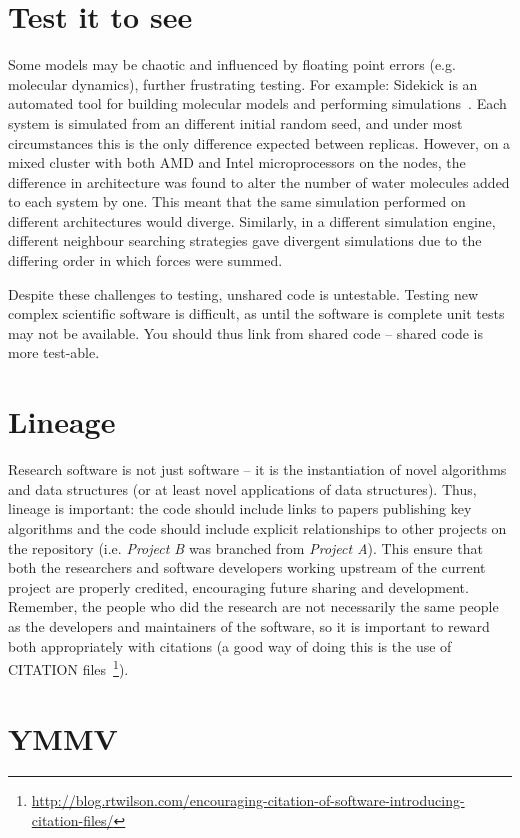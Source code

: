 \documentclass[conference]{IEEEtran}
\begin{document}
\section{Test it to see}

Some models may be chaotic and influenced by floating point errors
(e.g. molecular dynamics), further frustrating testing. For example:
Sidekick is an automated tool for building molecular models and
performing simulations~\cite{Hall2014Sidekick}. Each system is
simulated from an different initial random seed, and under most
circumstances this is the only difference expected between
replicas. However, on a mixed cluster with both AMD and Intel
microprocessors on the nodes, the difference in architecture was found
to alter the number of water molecules added to each system by
one. This meant that the same simulation performed on different
architectures would diverge. Similarly, in a different simulation
engine, different neighbour searching strategies gave divergent
simulations due to the differing order in which forces were summed.

Despite these challenges to testing, unshared code is untestable.
Testing new complex scientific software is
difficult, as until the software is complete unit tests may not be
available. You should thus link from shared code -- shared code is
more test-able.

\section{Lineage} 

Research software is not just software -- it is the instantiation of
novel algorithms and data structures (or at least novel applications
of data structures). Thus, lineage is important: the code should
include links to papers publishing key algorithms and the
code should include explicit relationships to other projects on the
repository (i.e. {\emph{Project B}} was branched from {\emph{Project
A}}). This ensure that both the researchers and software developers
working upstream of the current project are properly credited,
encouraging future sharing and development. Remember, the people who
did the research are not necessarily the same people as the developers
and maintainers of the software, so it is important to reward both
appropriately with citations (a good way of doing this is the use of
CITATION
files~\footnote{\url{http://blog.rtwilson.com/encouraging-citation-of-software-introducing-citation-files/}}).


\section{YMMV}
\end{document}
